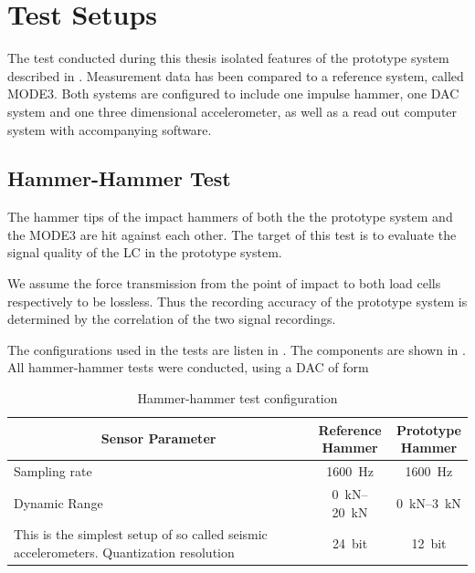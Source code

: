 \chapter{Test Setups%
  \label{chap:\currfilebase}}

The test conducted during this thesis isolated features of the prototype system described in . Measurement data has been compared to a reference system, called MODE3. Both systems are configured to include one impulse hammer, one \ac{DAC} system and one three dimensional accelerometer, as well as a read out computer system with accompanying software.

\section{Hammer-Hammer Test}

The hammer tips of the impact hammers of both the the prototype system and the MODE3 are hit against each other. The target of this test is to evaluate the signal quality of the \ac{LC} in the prototype system.

We assume the force transmission from the point of impact to both load cells respectively to be lossless. Thus the recording accuracy of the prototype system is determined by the correlation of the two signal recordings.

The configurations used in the tests are listen in . The components are shown in . All hammer-hammer tests were conducted, using a \ac{DAC} of form 

\begin{table}
  \centering
  {\renewcommand{\arraystretch}{1}%
  \footnotesize
  \begin{tabular}{lcc}
    \toprule
    \multicolumn{1}{c}{Sensor Parameter} & \makecell{Reference\\Hammer} & \makecell{Prototype\\Hammer}\\
    \midrule
    Sampling rate & \SI{1600}{\hertz} & \SI{1600}{\hertz}\\
    Dynamic Range & \SIrange{0}{20}{\kilo\newton} & \SIrange{0}{3}{\kilo\newton}\\ This is the simplest setup of so called seismic accelerometers.
    Quantization resolution & \SI{24}{bit} & \SI{12}{bit}\\
    \bottomrule
  \end{tabular}
  \caption[Hammer-Hammer Test Configuration]{Hammer-hammer test configuration%
    \label{tab:hh_config}}
  \normalsize
  }
\end{table}

